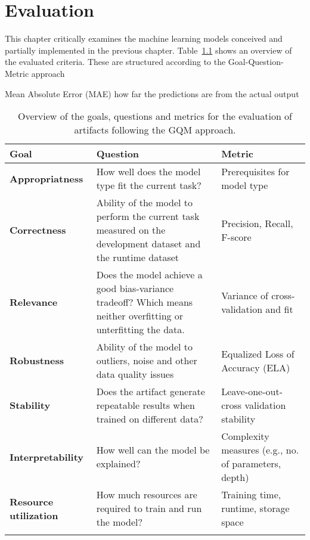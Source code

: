 \chapter{Evaluation}
This chapter critically examines the machine learning models conceived and partially implemented in the previous chapter.
Table~\ref*{tab:evaluation_criteria} shows an overview of the evaluated criteria. These are structured according to the Goal-Question-Metric approach

Mean Absolute Error (MAE) how far the predictions are from the actual output


\begin{longtable}{|l|p{7cm}|p{3cm}|}
    \hline
    \textbf{Goal}                 & \textbf{Question}                                                                                               & \textbf{Metric}                                      \\

    \hline
    \textbf{Appropriatness}       & How well does the model type fit the current task?                                                              & Prerequisites for model type                         \\
    \hline
    \textbf{Correctness}          & Ability of the model to perform the current task measured on the development dataset and the runtime dataset    &
    Precision, Recall, F-score                                                                                                                                                                             \\
    \hline
    \textbf{Relevance}            & Does the model achieve a good bias-variance tradeoff? Which means neither overfitting or unterfitting the data. & Variance of cross-validation and fit                 \\
    \hline
    \textbf{Robustness}           & Ability of the model to outliers, noise and other data quality issues                                           & Equalized Loss of Accuracy (ELA)                    \\
    \hline
    \textbf{Stability}            & Does the artifact generate repeatable results when trained on different data?                                   & Leave-one-out-cross validation stability                     \\
    \hline
    \textbf{Interpretability}     & How well can the model be explained?                                                                            & Complexity measures (e.g., no. of parameters, depth) \\
    \hline
    \textbf{Resource utilization} & How much resources are required to train and run the model?                                                     & Training time, runtime, storage space                \\
    \hline
    \caption{Overview of the goals, questions and metrics for the evaluation of artifacts following the \ac{GQM} approach.}
    \label{tab:evaluation_criteria}
\end{longtable}

